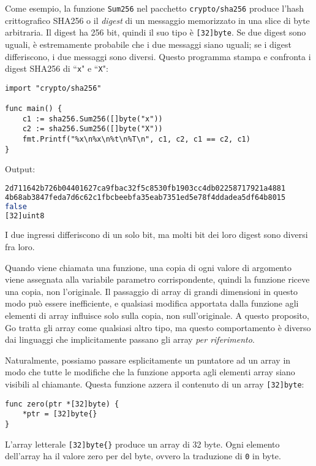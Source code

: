 \documentclass[../../thesis.tex]{subfiles}
\begin{document}
    Come esempio, la funzione \verb"Sum256" nel pacchetto \verb"crypto/sha256" produce l'hash crittografico SHA256 o il \textit{digest} di un messaggio memorizzato in una slice di byte arbitraria.
    Il digest ha 256 bit, quindi il suo tipo è \verb"[32]byte".
    Se due digest sono uguali, è estremamente probabile che i due messaggi siano uguali;
    se i digest differiscono, i due messaggi sono diversi.
    Questo programma stampa e confronta i digest SHA256 di ``\verb"x"" e ``\verb"X"":
    \begin{lstlisting}[frame = single,label={lst:lstlisting3-1.9}]
import "crypto/sha256"

func main() {
    c1 := sha256.Sum256([]byte("x"))
    c2 := sha256.Sum256([]byte("X"))
    fmt.Printf("%x\n%x\n%t\n%T\n", c1, c2, c1 == c2, c1)
}
    \end{lstlisting}
    Output:
    \begin{lstlisting}[language = bash, frame = L,label={lst:lstlisting3-1.10}]
2d711642b726b04401627ca9fbac32f5c8530fb1903cc4db02258717921a4881
4b68ab3847feda7d6c62c1fbcbeebfa35eab7351ed5e78f4ddadea5df64b8015
false
[32]uint8
    \end{lstlisting}
    I due ingressi differiscono di un solo bit, ma molti bit dei loro digest sono diversi fra loro.
    \hfill \vspace{12pt}

    Quando viene chiamata una funzione, una copia di ogni valore di argomento viene assegnata alla variabile parametro corrispondente, quindi la funzione riceve una copia, non l'originale.
    Il passaggio di array di grandi dimensioni in questo modo può essere inefficiente, e qualsiasi modifica apportata dalla funzione agli elementi di array influisce solo sulla copia, non sull'originale.
    A questo proposito, Go tratta gli array come qualsiasi altro tipo, ma questo comportamento è diverso dai linguaggi che implicitamente passano gli array \textit{per riferimento}.
    \hfill \vspace{12pt}

    Naturalmente, possiamo passare esplicitamente un puntatore ad un array in modo che tutte le modifiche che la funzione apporta agli elementi array siano visibili al chiamante.
    Questa funzione azzera il contenuto di un array \verb"[32]byte":
    \begin{lstlisting}[frame = single,label={lst:lstlisting3-1.11}]
func zero(ptr *[32]byte) {
    *ptr = [32]byte{}
}
    \end{lstlisting}
    L'array letterale \verb"[32]byte{}" produce un array di 32 byte.
    Ogni elemento dell'array ha il valore zero per del byte, ovvero la traduzione di \verb"0" in byte.
    \hfill \vspace{12pt}
\end{document}
